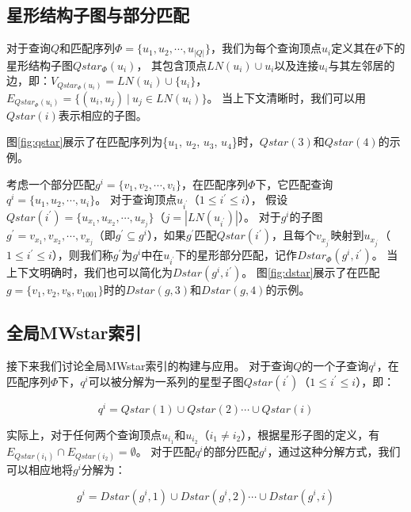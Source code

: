 \subsection{星形结构子图与部分匹配}
\label{mwstar:star_subquery}

\begin{definition}[星形结构子图]\label{def:star-subquery}
对于查询$Q$和匹配序列$\Phi=\{u_1, u_2, \cdots, u_{|Q|} \}$，我们为每个查询顶点$u_i$定义其在$\Phi$下的星形结构子图$Qstar_{\Phi}(u_i)$，
其包含顶点$LN(u_i) \cup {u_i}$以及连接$u_i$与其左邻居的边，即：$V_{Qstar_{\Phi}(u_i)} = LN(u_i) \cup \{u_i\}$，$E_{Qstar_{\Phi}(u_i)} = \{(u_i, u_j)\ |\ u_j\in LN(u_i)\}$。
当上下文清晰时，我们可以用$Qstar(i)$表示相应的子图。
\end{definition}

图\ref{fig:qstar}展示了在匹配序列为\{$u_1$, $u_2$, $u_3$, $u_4$\}时，$Qstar(3)$和$Qstar(4)$的示例。

考虑一个部分匹配$g^i=\{v_1, v_2, \cdots, v_i\}$，在匹配序列$\Phi$下，它匹配查询$q^i=\{u_1, u_2, \cdots, u_{i}\}$。
对于查询顶点$u_{i^\prime}$（$1 \leq i^\prime \leq i$），
假设$Qstar(i^\prime) = \{u_{x_1}, u_{x_2}, \cdots, u_{x_j}\}$（$j = |LN(u_{i^\prime})|$）。
对于$g^i$的子图$g^\prime = {v_{x_1}, v_{x_2}, \cdots, v_{x_j}}$（即$g^\prime \subseteq g^i$），如果$g^\prime$匹配$Qstar(i^\prime)$，且每个$v_{x_{j^\prime}}$映射到$u_{x_{j^\prime}}$（$1 \leq i^\prime \leq i$），则我们称$g^\prime$为$g^i$中在$u_{i^\prime}$下的星形部分匹配，记作$Dstar_{\Phi}(g^i, i^\prime)$。
当上下文明确时，我们也可以简化为$Dstar(g^i, i^\prime)$。
图\ref{fig:dstar}展示了在匹配$g=\{v_1, v_2, v_8, v_{1001}\}$时的$Dstar(g, 3)$和$Dstar(g, 4)$的示例。

\subsection{全局MWstar索引}
\label{mwstar:global}

接下来我们讨论全局MWstar索引的构建与应用。
对于查询$Q$的一个子查询$q^i$，在匹配序列$\Phi$下，$q^i$可以被分解为一系列的星型子图$Qstar(i^\prime)$（$1 \leq i^\prime \leq i$），即：

\[
	q^i = Qstar(1)\cup Qstar(2) \cdots \cup Qstar(i)
\]

实际上，对于任何两个查询顶点$u_{i_1}$和$u_{i_2}$（$i_1 \neq i_2$），根据星形子图的定义，有$E_{Qstar(i_1)} \cap E_{Qstar(i_2)} = \emptyset$。
对于匹配$q^i$的部分匹配$g^i$，通过这种分解方式，我们可以相应地将$g^i$分解为：

\begin{equation} \label{equation:dstar-decompose}
    g^i = Dstar(g^i, 1)\cup Dstar(g^i, 2) \cdots \cup Dstar(g^i, i)
\end{equation}

